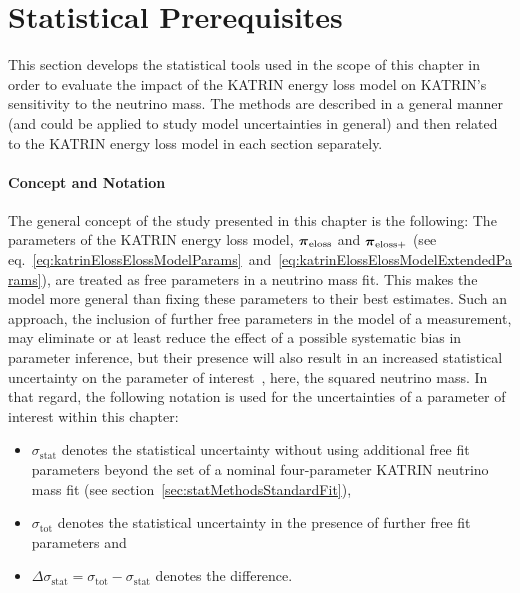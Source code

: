 \def\currentRootFolder{chapter/sensitivityStudyWithPreliminaryKatrinElossModel/statisticalPrerequisites}
\def\currentFigureFolder{\currentRootFolder/fig}



\section{Statistical Prerequisites}
\label{sec:katrinElossStatistics}
This section develops the statistical tools used in the scope of this chapter in order to evaluate the impact of the KATRIN energy loss model on KATRIN's sensitivity to the neutrino mass. The methods are described in a general manner (and could be applied to study model uncertainties in general) and then related to the KATRIN energy loss model in each section separately.


\paragraph{Concept and Notation}
The general concept of the study presented in this chapter is the following: The parameters of the KATRIN energy loss model, $\boldsymbol{\mathbf{\pi}}_\mathrm{eloss}$ and $\boldsymbol{\mathbf{\pi}}_\mathrm{eloss+}$ (see eq.~\ref{eq:katrinElossElossModelParams}~and~\ref{eq:katrinElossElossModelExtendedParams}), are treated as free parameters in a neutrino mass fit. This makes the model more general than fixing these parameters to their best estimates. Such an approach, the inclusion of further free parameters in the model of a measurement, may eliminate or at least reduce the effect of a possible systematic bias in parameter inference, but their presence will also result in an increased statistical uncertainty on the parameter of interest~\cite{ReviewOfParticlePhysics}, here, the squared neutrino mass. In that regard, the following notation is used for the uncertainties of a parameter of interest within this chapter:
\newcommand{\intrStatUncert}{\sigma_\mathrm{stat}}%
\newcommand{\totStatUncert}{\sigma_\mathrm{tot}}%
\newcommand{\deltaStatUncert}{\Delta\sigma_\mathrm{stat}}%
\begin{itemize}
	\item $\intrStatUncert$ denotes the statistical uncertainty without using additional free fit parameters beyond the set of a nominal four-parameter KATRIN neutrino mass fit (see section~\ref{sec:statMethodsStandardFit}),
	\item $\totStatUncert$ denotes the statistical uncertainty in the presence of further free fit parameters and
	\item $\deltaStatUncert = \totStatUncert-\intrStatUncert$ denotes the difference.
\end{itemize}


